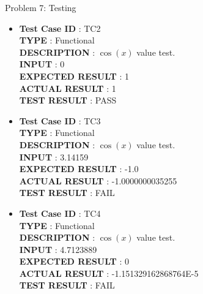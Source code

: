 \documentclass[a4paper,12pt]{article}
\begin{document}
\begin{section}{Problem 7: Testing}
\begin{itemize}
	\item \textbf{Test Case ID} \hspace{1.85cm} : TC2  \\
	\textbf{TYPE } \hspace{3.05cm}  : Functional\\
	\textbf{DESCRIPTION }\hspace{1.15cm} : $\cos(x)$ value test. \\
	\textbf{INPUT} \hspace{3.05cm} :  0 \\
	\textbf{EXPECTED RESULT} \hspace{0.01cm} : 1 \\
	\textbf{ACTUAL RESULT} \hspace{0.6cm} : 1 \\
	\textbf{TEST RESULT} \hspace{1.45cm} : PASS \\	
	
	\item \textbf{Test Case ID} \hspace{1.85cm} : TC3  \\
	\textbf{TYPE } \hspace{3.05cm}  : Functional\\
	\textbf{DESCRIPTION }\hspace{1.15cm} : $\cos(x)$ value test. \\
	\textbf{INPUT} \hspace{3.05cm} :  3.14159 \\
	\textbf{EXPECTED RESULT} \hspace{0.01cm} : -1.0 \\
	\textbf{ACTUAL RESULT} \hspace{0.6cm} : -1.0000000035255 \\
	\textbf{TEST RESULT} \hspace{1.45cm} : FAIL \\
	
	
	\item \textbf{Test Case ID} \hspace{1.85cm} : TC4  \\
	\textbf{TYPE } \hspace{3.05cm}  : Functional\\
	\textbf{DESCRIPTION }\hspace{1.15cm} : $\cos(x)$ value test. \\
	\textbf{INPUT} \hspace{3.05cm} :  4.7123889 \\
	\textbf{EXPECTED RESULT} \hspace{0.01cm} : 0 \\
	\textbf{ACTUAL RESULT} \hspace{0.6cm} : -1.151329162868764E-5 \\
	\textbf{TEST RESULT} \hspace{1.45cm} : FAIL \\


\end{itemize}
\end{section}
\end{document}
